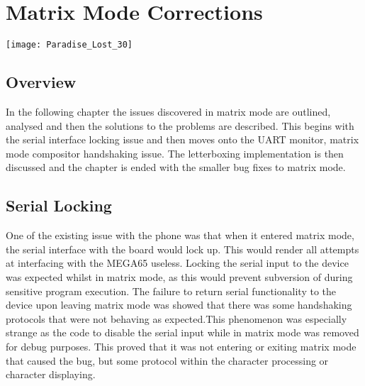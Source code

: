 
\chapter{Matrix Mode Corrections} %

\label{Chapter 5} %

\texttt{[image: Paradise\_Lost\_30]}

\section{Overview}

In the following chapter the issues discovered in matrix mode are outlined, analysed and then the solutions to the problems are described. This begins with the serial interface locking issue and then moves onto the UART monitor, matrix mode compositor handshaking issue. The letterboxing implementation is then discussed and the chapter is ended with the smaller bug fixes to matrix mode.


\section{Serial Locking}

\label{Ch5 Sec1}

One of the existing issue with the phone was that when it entered matrix mode, the serial interface with the board would lock up. This would render all attempts at interfacing with the MEGA65 useless. Locking the serial input to the device was expected whilst in matrix mode, as this would prevent subversion of during sensitive program execution. The failure to return serial functionality to the device upon leaving matrix mode was showed that there was some handshaking protocols that were not behaving as expected.This phenomenon was especially strange as the code to disable the serial input while in matrix mode was removed for debug purposes. This proved that it was not entering or exiting matrix mode that caused the bug, but some protocol within the character processing or character displaying.

